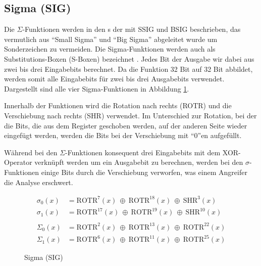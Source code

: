 \subsection{Sigma (SIG)}
Die $\Sigma$-Funktionen werden in den s der  mit SSIG und BSIG beschrieben, das vermutlich aus "`Small Sigma"' und "`Big Sigma"' abgeleitet wurde
um Sonderzeichen zu vermeiden. Die Sigma-Funktionen werden auch als Substitutions-Boxen (S-Boxen) bezeichnet \cite[1]{sha256analyse}. Jedes Bit der Ausgabe wir dabei
aus zwei bis drei Eingabebits berechnet. Da die Funktion 32 Bit auf 32 Bit abbildet, werden somit alle Eingabebits für zwei bis drei Ausgabebits verwendet.
Dargestellt sind alle vier Sigma-Funktionen in Abbildung \ref{eq:sig}.

Innerhalb der Funktionen wird die Rotation nach rechts (ROTR) und die Verschiebung nach rechts (SHR) verwendet. Im Unterschied zur Rotation, bei der die Bits,
die aus dem Register geschoben werden, auf der anderen Seite wieder eingefügt werden, werden die Bits bei der Verschiebung mit "`$0$"'en aufgefüllt.

Während bei den $\Sigma$-Funktionen konsequent drei Eingabebits mit dem XOR-Operator verknüpft werden um ein Ausgabebit zu berechnen, werden bei den $\sigma$-Funktionen
einige Bits durch die Verschiebung verworfen, was einem Angreifer die Analyse erschwert.

\begin{figure}[!h]
  \begin{align}
  \sigma_0(x) &= \text{ROTR}^{7}(x)~\oplus~\text{ROTR}^{18}(x)~\oplus~\text{SHR}^{3}(x) \nonumber\\
  \sigma_1(x) &= \text{ROTR}^{17}(x)~\oplus~\text{ROTR}^{19}(x)~\oplus~\text{SHR}^{10}(x) \nonumber\\
  \nonumber\\
  \Sigma_0(x) &= \text{ROTR}^{2}(x)~\oplus~\text{ROTR}^{13}(x)~\oplus~\text{ROTR}^{22}(x) \nonumber\\
  \Sigma_1(x) &= \text{ROTR}^{6}(x)~\oplus~\text{ROTR}^{11}(x)~\oplus~\text{ROTR}^{25}(x) \nonumber
  \end{align}
  \caption{Sigma (SIG)}
  \label{eq:sig}
\end{figure}